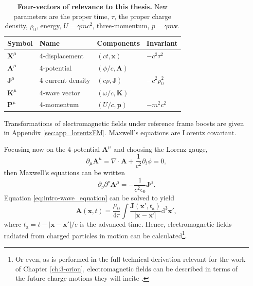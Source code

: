\begin{table}
	\begin{center}
		\begin{tabular}{llll}
			\hline \hline
			Symbol & Name & Components & Invariant \\
			\hline
			$\mathbf{X}^\mu$& 4-displacement & $(ct, \mathbf{x})$ & $-c^2\tau^2$  \\
			$\mathbf{A}^\mu$&4-potential  & $(\phi/c, \mathbf{A})$  &  \\
			$\mathbf{J}^\mu$& 4-current density & $(c\rho,\mathbf{J})$ & $-c^2\rho_0^2$ \\
			$\mathbf{K}^\mu$& 4-wave vector &$(\omega/c, \mathbf{K})$  &  \\
			$\mathbf{P}^\mu$& 4-momentum &  $(U/c, \mathbf{p})$& $-m^2c^2$ \\
			\hline \hline
		\end{tabular}
		\caption{\label{tab:intro-four-vectors} \textbf{Four-vectors of relevance to this thesis.} New parameters are the proper time, $\tau$, the proper charge density, $\rho_0$, energy, $U = \gamma m c^2$, three-momentum, $p = \gamma m\mathbf{v}$.}
	\end{center}
\end{table}
Transformations of electromagnetic fields under reference frame boosts are given in Appendix \ref{sec:app_lorentzEM}. Maxwell's equations are Lorentz covariant.

Focusing now on the 4-potential $\mathbf{A}^\mu$ and choosing the Lorenz gauge,
\begin{equation}
	\partial_\mu \mathbf{A}^\mu = \nabla \cdot \mathbf{A} + \frac{1}{c^2}\partial_t \phi = 0,
\end{equation}
then Maxwell's equations can be written
\begin{equation}\label{eq:intro-wave_equation}
	\partial_\nu \partial^\nu \mathbf{A}^\mu = -\frac{1}{c^2\epsilon_0}\mathbf{J}^\mu.
\end{equation}
Equation \ref{eq:intro-wave_equation} can be solved to yield 
\begin{equation}
	\mathbf{A}(\mathbf{x},t) = \frac{\mu_0}{4\pi} \int \frac{\mathbf{J}(\mathbf{x'},t_\mathrm{a})}{|\mathbf{x}-\mathbf{x}'|} \mathrm{d}^3\mathbf{x}',
\end{equation}
where $t_\mathrm{a} = t- |\mathbf{x}-\mathbf{x}'|/c$ is the advanced time. Hence, electromagnetic fields radiated from charged particles in motion can be calculated\footnote{Or even, as is performed in the full technical derivation relevant for the work of Chapter \ref{ch:3-orion}, electromagnetic fields can be described in terms of the future charge motions they will incite \cite{baevaHighHarmonicGeneration2008}.}.

